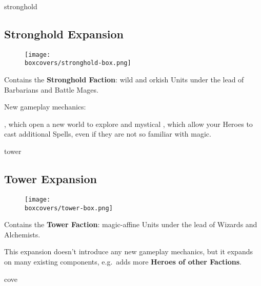 \begin{multicols}{2}
\begin{expansion}[title=]{stronghold}
    \subsection*{\color{stronghold}Stronghold Expansion}
    \setlength\intextsep{0pt}
    \setlength\columnsep{0.8em}
    \begin{wrapfigure}{l}{0.35\textwidth}
        \texttt{[image: \\boxcovers/stronghold-box.png]}
    \end{wrapfigure}
    Contains the \textbf{Stronghold Faction}: wild and orkish Units under the lead of Barbarians and Battle Mages.\par
    \medskip
    New gameplay mechanics:\par
    \smallskip
    , which open a new world to explore and mystical ,
    which allow your Heroes to cast additional Spells, even if they are not so familiar with magic.
\end{expansion}

\vspace*{1em}
\begin{expansion}[title=]{tower}
    \subsection*{\color{tower}Tower Expansion}
    \setlength\intextsep{0pt}
    \setlength\columnsep{0.8em}
    \begin{wrapfigure}{l}{0.35\textwidth}
        \texttt{[image: \\boxcovers/tower-box.png]}
    \end{wrapfigure}
    Contains the \textbf{Tower Faction}: magic-affine Units under the lead of Wizards and Alchemists.\par
    \medskip
    This expansion doesn't introduce any new gameplay mechanics, but it expands on many existing components, e.g.~adds more \textbf{Heroes of other Factions}.
\end{expansion}
\vspace*{\fill}
\columnbreak

\begin{expansion}[title=]{cove}

\end{expansion}
\end{multicols}

